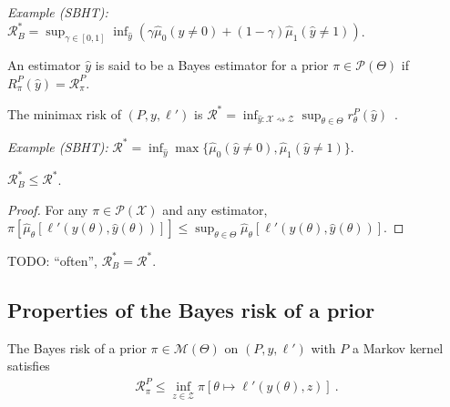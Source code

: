 \emph{Example (SBHT):} $\mathcal R^*_B = \sup_{\gamma \in [0,1]}\inf_{\hat{y}}\left(\gamma \hat{\mu}_0(\hat{y} \ne 0) + (1 - \gamma) \hat{\mu}_1(\hat{y} \ne 1)\right)$.

\begin{definition}
  \label{def:bayesEstimator}
  \leanok
  An estimator $\hat{y}$ is said to be a Bayes estimator for a prior $\pi \in \mathcal P(\Theta)$ if $R^P_\pi(\hat{y}) = \mathcal R^P_\pi$.
\end{definition}

\begin{definition}
  \label{def:minimaxRisk}
  \leanok
  The minimax risk of $(P, y, \ell')$ is $\mathcal R^* = \inf_{\hat{y} : \mathcal X \rightsquigarrow \mathcal Z} \sup_{\theta \in \Theta} r^P_\theta(\hat{y})$~.
\end{definition}

\emph{Example (SBHT):} $\mathcal R^* = \inf_{\hat{y}} \max\{\hat{\mu}_0(\hat{y} \ne 0), \hat{\mu}_1(\hat{y} \ne 1)\}$.

\begin{lemma}
  \label{lem:bayesRisk_le_minimaxRisk}
  \leanok
  $\mathcal R_B^* \le \mathcal R^*$.
\end{lemma}

\begin{proof}\leanok
For any $\pi \in \mathcal P(\mathcal X)$ and any estimator, $\pi\left[\hat{\mu}_\theta\left[\ell'(y(\theta), \hat{y}(\theta))\right]\right] \le \sup_{\theta \in \Theta}\hat{\mu}_\theta\left[\ell'(y(\theta), \hat{y}(\theta))\right]$.
\end{proof}

TODO: ``often'', $\mathcal R^*_B = \mathcal R^*$.




\subsection{Properties of the Bayes risk of a prior}

\begin{lemma}
  \label{lem:bayesRisk_le_const}
  \leanok
  The Bayes risk of a prior $\pi \in \mathcal M(\Theta)$ on $(P, y, \ell')$ with $P$ a Markov kernel satisfies
  \begin{align*}
  \mathcal R^P_\pi \le \inf_{z \in \mathcal Z} \pi\left[ \theta \mapsto \ell'(y(\theta), z) \right]
  \: .
  \end{align*}
\end{lemma}

